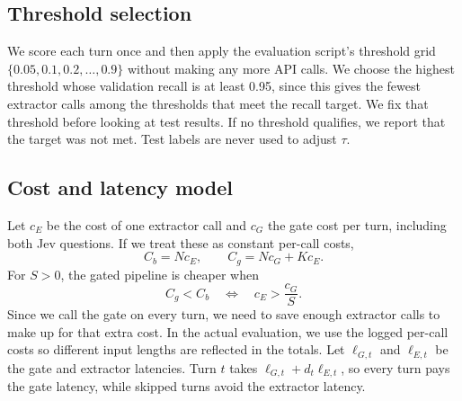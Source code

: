 \subsection{Threshold selection}
We score each turn once and then apply the evaluation script's threshold grid $\{0.05,0.1,0.2,\ldots,0.9\}$ without making any more API calls. We choose the highest threshold whose validation recall is at least 0.95, since this gives the fewest extractor calls among the thresholds that meet the recall target. We fix that threshold before looking at test results. If no threshold qualifies, we report that the target was not met. Test labels are never used to adjust $\tau$.

\subsection{Cost and latency model}
\label{sec:cost}
Let $c_E$ be the cost of one extractor call and $c_G$ the gate cost per turn, including both Jev questions. If we treat these as constant per-call costs,
\begin{equation}
C_b=Nc_E,\qquad C_g=Nc_G+Kc_E.
\end{equation}
For $S>0$, the gated pipeline is cheaper when
\begin{equation}
C_g<C_b\quad\Longleftrightarrow\quad c_E>\frac{c_G}{S}.
\end{equation}
Since we call the gate on every turn, we need to save enough extractor calls to make up for that extra cost. In the actual evaluation, we use the logged per-call costs so different input lengths are reflected in the totals. Let $\ell_{G,t}$ and $\ell_{E,t}$ be the gate and extractor latencies. Turn $t$ takes $\ell_{G,t}+d_t\ell_{E,t}$, so every turn pays the gate latency, while skipped turns avoid the extractor latency.
